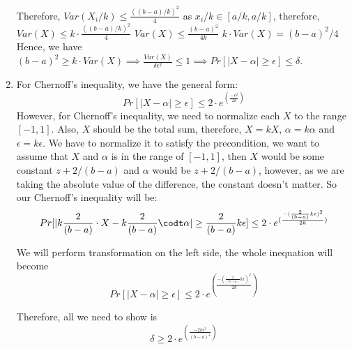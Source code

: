 \documentclass[11pt]{article}%
\begin{document}
\begin{questions}[1]
\begin{enumerate}
    Therefore, $Var(X_i/k) \leq \frac{((b-a)/k)^2}{4}$ as $x_i/k \in [a/k,a/k]$, therefore, $Var(X) \leq k \cdot \frac{((b-a)/k)^2}{4}$ \implies$Var(X) \leq \frac{(b-a)^2}{4k}$ \implies
    \newline
    $k \cdot Var(X) = (b-a)^2/4$
    \newline
    \newline
    Hence, we have $(b-a)^2 \geq k \cdot Var(X) \implies \frac{Var(X)}{\delta \epsilon ^2} \leq 1 \implies Pr[|X-\alpha| \geq \epsilon] \leq \delta$.
    \newpage
    \item   For Chernoff's inequality, we have the general form:
    $$Pr[|X - \alpha| \geq \epsilon] \leq 2 \cdot e^{(\frac {-\epsilon ^2}{2k})} $$ 
    However, for Chernoff's inequality, we need to normalize each $X$ to the range $[-1,1]$. Also, $X$ should be the total sum, therefore, $X = kX$, $\alpha = k\alpha$ and $\epsilon = k\epsilon$. We have to normalize it to satisfy the precondition, we want to assume that $X$ and $\alpha$ is in the range of $[-1,1]$, then $X$ would be some constant $z+2/(b-a)$ and $\alpha$ would be $z+ 2/(b-a)$, however, as we are taking the absolute value of the difference, the constant doesn't matter. So our Chernoff's inequality will be:
    $$ Pr[|k \frac{2}{(b-a)} \cdot X - k \frac{2}{(b-a)}\codt \alpha| \geq \frac{2}{(b-a)}k\epsilon] \leq 2 \cdot e^{(\frac {-(\frac{2}{(b-a)}k\epsilon)^2}{2k})} $$
    
    We will perform transformation on the left side, the whole inequation will become 
    $$ Pr[| X - \alpha|\geq \epsilon] \leq  2 \cdot e^{(\frac {-(\frac{2}{(b-a)}k\epsilon)^2}{2k})} $$
    

    Therefore, all we need to show is 
    $$ \delta \geq 2 \cdot e^{(\frac {-2k\epsilon^2}{(b-a)^2})} $$


\end{enumerate}
\end{questions}
\end{document}
